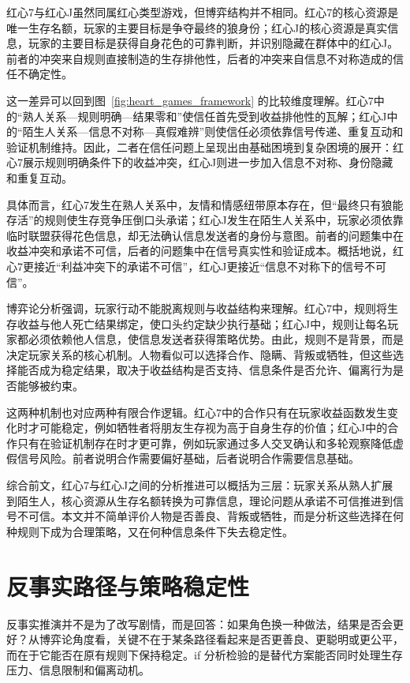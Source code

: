 \documentclass{article}
\begin{document}
红心7与红心J虽然同属红心类型游戏，但博弈结构并不相同。红心7的核心资源是唯一生存名额，玩家的主要目标是争夺最终的狼身份；红心J的核心资源是真实信息，玩家的主要目标是获得自身花色的可靠判断，并识别隐藏在群体中的红心J。前者的冲突来自规则直接制造的生存排他性，后者的冲突来自信息不对称造成的信任不确定性。

这一差异可以回到图~\ref{fig:heart_games_framework} 的比较维度理解。红心7中的“熟人关系—规则明确—结果零和”使信任首先受到收益排他性的瓦解；红心J中的“陌生人关系—信息不对称—真假难辨”则使信任必须依靠信号传递、重复互动和验证机制维持。因此，二者在信任问题上呈现出由基础困境到复杂困境的展开：红心7展示规则明确条件下的收益冲突，红心J则进一步加入信息不对称、身份隐藏和重复互动。

具体而言，红心7发生在熟人关系中，友情和情感纽带原本存在，但“最终只有狼能存活”的规则使生存竞争压倒口头承诺；红心J发生在陌生人关系中，玩家必须依靠临时联盟获得花色信息，却无法确认信息发送者的身份与意图。前者的问题集中在收益冲突和承诺不可信，后者的问题集中在信号真实性和验证成本。概括地说，红心7更接近“利益冲突下的承诺不可信”，红心J更接近“信息不对称下的信号不可信”。

博弈论分析强调，玩家行动不能脱离规则与收益结构来理解。红心7中，规则将生存收益与他人死亡结果绑定，使口头约定缺少执行基础；红心J中，规则让每名玩家都必须依赖他人信息，使信息发送者获得策略优势。由此，规则不是背景，而是决定玩家关系的核心机制。人物看似可以选择合作、隐瞒、背叛或牺牲，但这些选择能否成为稳定结果，取决于收益结构是否支持、信息条件是否允许、偏离行为是否能够被约束。

这两种机制也对应两种有限合作逻辑。红心7中的合作只有在玩家收益函数发生变化时才可能稳定，例如牺牲者将朋友生存视为高于自身生存的价值；红心J中的合作只有在验证机制存在时才更可靠，例如玩家通过多人交叉确认和多轮观察降低虚假信号风险。前者说明合作需要偏好基础，后者说明合作需要信息基础。

综合前文，红心7与红心J之间的分析推进可以概括为三层：玩家关系从熟人扩展到陌生人，核心资源从生存名额转换为可靠信息，理论问题从承诺不可信推进到信号不可信。本文并不简单评价人物是否善良、背叛或牺牲，而是分析这些选择在何种规则下成为合理策略，又在何种信息条件下失去稳定性。

\section{反事实路径与策略稳定性}

反事实推演并不是为了改写剧情，而是回答：如果角色换一种做法，结果是否会更好？从博弈论角度看，关键不在于某条路径看起来是否更善良、更聪明或更公平，而在于它能否在原有规则下保持稳定。if 分析检验的是替代方案能否同时处理生存压力、信息限制和偏离动机。
\end{document}
